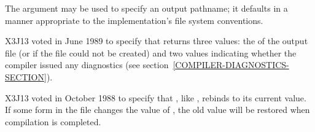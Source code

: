 The  argument may be used to specify an output pathname;
it defaults in a manner
appropriate to the implementation's file system conventions.


\begin{newer}
X3J13 voted in June 1989  to specify that
 returns three values: the  of the output
file (or  if the file could not be created) and two values
indicating whether the compiler issued any diagnostics
(see section~\ref{COMPILER-DIAGNOSTICS-SECTION}).
\end{newer}

\begin{newer}
X3J13 voted in October 1988  to specify that
, like , rebinds  to its current value.  If
some form in the file changes the value of ,
the old value will be restored when compilation is completed.
\end{newer}


